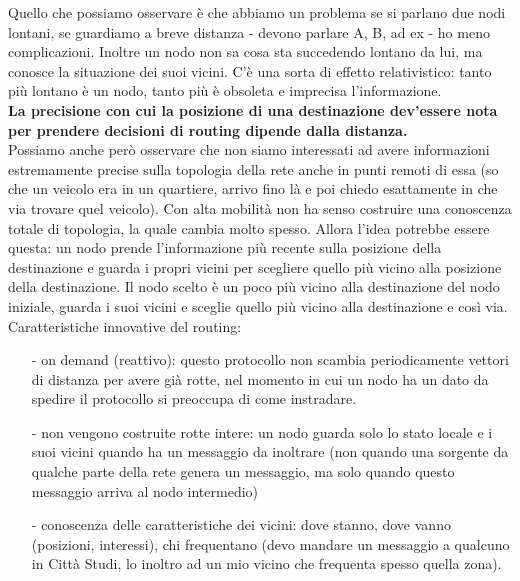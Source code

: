 \documentclass[12pt,italian]{report}
\begin{document}
Quello che possiamo osservare è che abbiamo un problema se si parlano due nodi lontani, se guardiamo a breve distanza - devono parlare A, B,  ad ex - ho meno complicazioni. Inoltre un nodo non sa cosa sta succedendo lontano da lui, ma conosce la situazione dei suoi vicini. C'è una sorta di effetto relativistico: tanto più lontano è un nodo, tanto più è obsoleta e imprecisa l'informazione. \\ \textbf{La precisione con cui la posizione di una destinazione dev'essere nota per prendere decisioni di routing dipende dalla distanza.} \\Possiamo anche però osservare che non siamo interessati ad avere informazioni estremamente precise sulla topologia della rete anche in punti remoti di essa (so che un veicolo era in un quartiere, arrivo fino là e poi chiedo esattamente in che via trovare quel veicolo). 
\bigbreak
Con alta mobilità non ha senso costruire una conoscenza totale di topologia, la quale cambia molto spesso. Allora l'idea potrebbe essere questa: un nodo prende l'informazione più recente sulla posizione della destinazione e guarda i propri vicini per scegliere quello più vicino alla posizione della destinazione. Il nodo scelto è un poco più vicino alla destinazione del nodo iniziale, guarda i suoi vicini e sceglie quello più vicino alla destinazione e così via. 
\bigbreak
\noindent Caratteristiche innovative del routing:
\begin{itemize}
    \item [-] on demand (reattivo): questo protocollo non scambia periodicamente vettori di distanza per avere già rotte, nel momento in cui un nodo ha un dato da spedire il protocollo si preoccupa di come instradare. 
    \item [-] non vengono costruite rotte intere: un nodo guarda solo lo stato locale e i suoi vicini quando ha un messaggio da inoltrare (non quando una sorgente da qualche parte della rete genera un messaggio, ma solo quando questo messaggio arriva al nodo intermedio)
    \item [-] conoscenza delle caratteristiche dei vicini: dove stanno, dove vanno (posizioni, interessi), chi frequentano (devo mandare un messaggio a qualcuno in Città Studi, lo inoltro ad un mio vicino che frequenta spesso quella zona).
\end{itemize}
\end{document}
